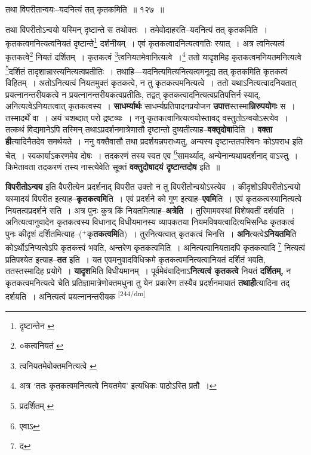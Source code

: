 \documentclass[article,12pt,a4paper]{memoir}
\newcommand{\add}[1]{($^{+}$#1)}
\begin{document}
	तथा विपरीतान्वयः--यदनित्यं तत् कृतकमिति ॥ १२७ ॥ 
	  
	तथा विपरीतोऽन्वयो यस्मिन् दृष्टान्ते स तथोक्तः । तमेवोदाहरति--यदनित्यं तत् कृतकमिति । कृतकत्वमनित्यत्वनियतं दृष्टान्ते\footnote{दृष्टान्तेन \cite{dp-edE}} दर्शनीयम् । एवं कृतकत्वादनित्यत्वगतिः स्यात् । अत्र त्वनित्यत्वं कृतकत्वे\footnote{०कत्वनियतं \cite{dp-msD}} नियतं दर्शितम् । कृतकत्वं \footnote{त्वनियतमेवोक्तमनित्यत्वे \cite{dp-msC} \cite{dp-msD}}त्वनियतमेवानित्यत्वे ।\footnote{अत्र ‘ततः कृतकत्वमनित्यत्वे नियतमेव’ इत्यधिकः पाठोऽस्ति \cite{dp-edE} प्रतौ ।} ततो यादृशमिह कृतकत्वमनियतमनित्यत्वे \footnote{प्रदर्शितम् \cite{dp-msA} \cite{dp-msB} \cite{dp-edP} \cite{dp-edH} \cite{dp-edE} \cite{dp-edN}}दर्शितं तादृशान्नास्त्यनित्यत्वप्रतीतिः । तथाहि—यदनित्यमित्यनित्यत्वमनूद्य तत् कृतकमिति कृतकत्वं विहितम् । अतोऽनित्यत्वं नियतमुक्तं कृतकत्वे, न तु कृतकत्वमनित्यत्वे । ततो यथाऽनित्यत्वादनियतात् प्रयत्नानन्तरीयकत्वे न प्रयत्नानन्तरीयकत्वप्रतीतिः, तद्वत् कृतकत्वादनित्यत्वप्रतिपत्तिर्न स्याद्, अनित्यत्वेऽनियतत्वात् कृतकत्वस्य । \textbf{साधर्म्यार्थः} साधर्म्यप्रतिपादनप्रयोजन \textbf{उपात्त}स्तस्मा\textbf{न्निरुपयोगः} स । तस्मादर्थें वा । अयं चशब्दात् परो द्रष्टव्यः । ननु कृतकत्वानित्यत्वयोस्तावद् वस्तुतोऽन्वयोऽस्त्येव । तत्कथं विद्यमानेऽपि तस्मिन् तथाऽप्रदर्शनमात्रेणासौ दृष्टान्तो दुष्यतीत्याह--\textbf{वक्तृदोषा}दिति । \textbf{वक्ता ही}त्यादिनैतदेव समर्थयते । ननु वक्तैवासौ तथा प्रदर्शयन्नपराध्यतु, अन्यस्य दृष्टान्ततपस्विनः कोऽपराध इति चेत् । स्वकार्याऽकरणमेव दोषः । तदकरणं तस्य स्वत एव \footnote{एवाऽ}सामर्थ्याद्, अन्येनान्यथाप्रदर्शनाद् वाऽस्तु । किमेतावता तदकरणं तस्य नास्त्येवेति सूक्तं \textbf{वक्तुदोषादयं दृष्टान्तदोष} इति ॥
	\pend
      

	  \pstart \textbf{विपरीतोऽन्वय} इति वैपरीत्येन प्रदर्शनाद् विपरीत उक्तो न तु विपरीतोन्वयोऽस्त्येव । कीदृशोऽविपरीतोऽन्वयो यस्मादयं विपरीत इत्याह--\textbf{कृतकत्वमि}ति । एवं प्रदर्शने को गुण इत्याह--\textbf{एवमि}ति । एवं कृतकत्वस्यानित्यत्वे नियतत्वप्रदर्शने सति । अत्र पुनः कुत्र किं नियतमित्याह--\textbf{अत्रेति} । तुरिमामवस्थां विशेषवतीं दर्शयति । अनित्यत्वानुवादेन कृतकत्वस्य विधानाद् विधीयमानस्य व्यापकतया नियमविषयत्वादित्यभिसन्धिः कृतकत्वं पुनः कीदृशं दर्शितमित्याह--\add{कृ\textbf{तकत्वमि}ति} । तुरनित्यत्वात् कृतकत्वं भिनत्ति । \textbf{अनि}त्यत्वे\textbf{ऽनियतमि}ति कोऽर्थोऽनिप्यत्वेऽपि कृतकत्त्वं भवति, अन्तरेण कृतकत्वमिति । अनित्यत्वानियतादपि कृतकत्वादि \footnote{द} नित्यत्वं प्रतिपश्येत इत्याह--\textbf{तत} इति । यत एवमनुवादविधिक्रमे कृतकत्वमनित्यत्वानियतं दर्शितं भवति, ततस्तस्मादिह प्रयोगे । \textbf{यादृश}मिति विधीयमानम् । पूर्वमेवंवादिनाऽ\textbf{नित्यत्वं कृतकत्वे} नियतं \textbf{दर्शितम्,} न कृतकत्वमनित्यत्वे चेति प्रतिज्ञामात्रेणोक्तमधुना तु येन प्रकारेण तस्यैव प्रदर्शनमायातं \textbf{तथाही}त्यादिना तद् दर्शयति । अनित्यत्वं प्रयत्नानन्तरीयक  \leavevmode\textsuperscript{\rmlatinfont\tiny [244/dm]} 
	  
\end{document}
